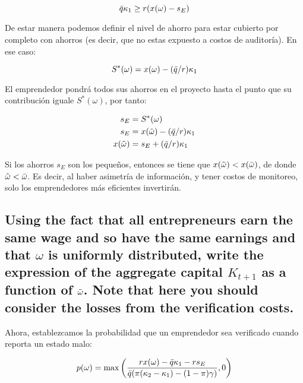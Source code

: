 \documentclass[12pt]{article}
\begin{document}
\[
\Bar{q}\kappa_1 \geq r(x(\omega)-s_E)
\]

De estar manera podemos definir el nivel de ahorro para estar cubierto por completo con ahorros (es decir, que no estas expuesto a costos de auditoría). En ese caso:

\[
S^*(\omega) = x(\omega)-(\Bar{q}/r)\kappa_1
\]

El emprendedor pondrá todos sus ahorros en el proyecto hasta el punto que su contribución iguale $S^*(\omega)$, por tanto:

\begin{align*}
    s_E &= S^*(\omega)  \\
    s_E &= x(\Tilde{\omega}) - (\Bar{q}/r)\kappa_1 \\
    x(\Tilde{\omega})  &= s_E + (\Bar{q}/r)\kappa_1
\end{align*}

Si los ahorros $s_E$ son los pequeños, entonces se tiene que $x(\Tilde{\omega}) < x(\Bar{\omega})$, de donde $\Tilde{\omega} < \Bar{\omega}$. Es decir, al haber asimetría de información, y tener costos de monitoreo, solo los emprendedores más eficientes invertirán.

\subsection{Using the fact that all entrepreneurs earn the same wage and so have the same earnings and that $\omega$ is uniformly distributed, write the expression of the aggregate capital $K_{t+1}$ as a function of $\Tilde{\omega}$. Note that here you should consider the losses from the verification costs.}

Ahora, establezcamos la probabilidad que un emprendedor sea verificado cuando reporta un estado malo:

\[
    p(\omega) = \max \left ( \frac{rx(\omega) - \Bar{q}\kappa_1 - r s_E}{\Bar{q}(\pi(\kappa_2 - \kappa_1) - (1-\pi)\gamma)} , 0 \right )
\]
\end{document}
